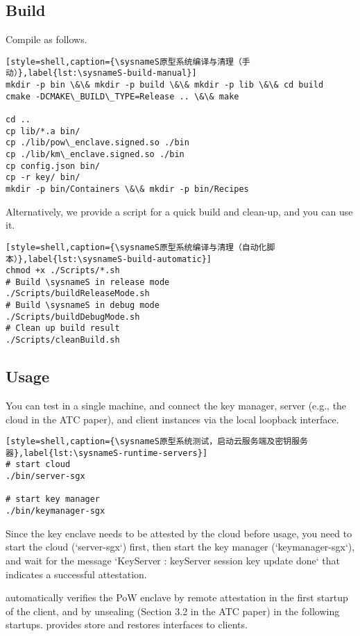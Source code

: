 \subsection{Build}

Compile \sysnameS as follows.

\begin{lstlisting}[style=shell,caption={\sysnameS原型系统编译与清理（手动）},label{lst:\sysnameS-build-manual}]
mkdir -p bin \&\& mkdir -p build \&\& mkdir -p lib \&\& cd build
cmake -DCMAKE\_BUILD\_TYPE=Release .. \&\& make

cd ..
cp lib/*.a bin/
cp ./lib/pow\_enclave.signed.so ./bin
cp ./lib/km\_enclave.signed.so ./bin
cp config.json bin/
cp -r key/ bin/
mkdir -p bin/Containers \&\& mkdir -p bin/Recipes
\end{lstlisting}

Alternatively, we provide a script for a quick build and clean-up, and you can use it.

\begin{lstlisting}[style=shell,caption={\sysnameS原型系统编译与清理（自动化脚本）},label{lst:\sysnameS-build-automatic}]
chmod +x ./Scripts/*.sh
# Build \sysnameS in release mode
./Scripts/buildReleaseMode.sh
# Build \sysnameS in debug mode
./Scripts/buildDebugMode.sh
# Clean up build result
./Scripts/cleanBuild.sh
\end{lstlisting}

\subsection{Usage}

You can test \sysnameS in a single machine, and connect the key manager, server (e.g., the cloud in the ATC paper), and client instances via the local loopback interface.

\begin{lstlisting}[style=shell,caption={\sysnameS原型系统测试，启动云服务端及密钥服务器},label{lst:\sysnameS-runtime-servers}]
# start cloud
./bin/server-sgx

# start key manager
./bin/keymanager-sgx
\end{lstlisting}

Since the key enclave  needs to be attested by the cloud before usage, you need to start the cloud (`server-sgx`) first, then start the key manager (`keymanager-sgx`), and wait for the message `KeyServer : keyServer session key update done` that indicates a successful attestation.

\sysnameS automatically verifies the PoW enclave by remote attestation in the first startup of the client, and by unsealing (Section 3.2 in the ATC paper) in the following startups. \sysnameS provides store and restores interfaces to clients.

